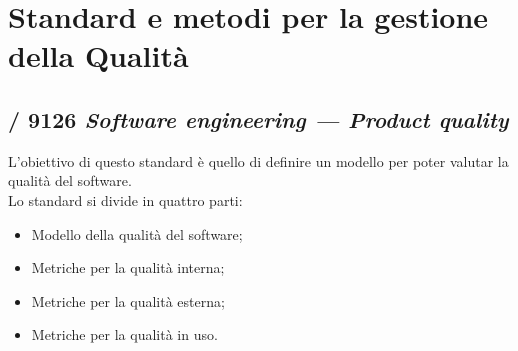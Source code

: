 \section{Standard e metodi per la gestione della Qualità}
  \subsection{/ 9126 \emph{Software engineering — Product quality}}
  L'obiettivo di questo standard è quello di definire un modello per poter valutar la qualità del software.\\
  Lo standard si divide in quattro parti:
  \begin{itemize}
    \item Modello della qualità del software;
    \item Metriche per la qualità interna;
    \item Metriche per la qualità esterna;
    \item Metriche per la qualità in uso.
  \end{itemize}
